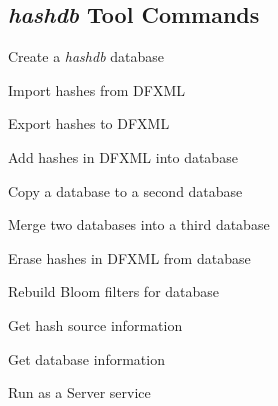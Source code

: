 \documentclass[12pt,twoside]{article}
\newcommand{\hdb}{\emph{hashdb}\xspace}
\begin{document}
\subsection{\hdb Tool Commands}
\begin{compactitem}
\item Create a \hdb database
\item Import hashes from DFXML
\item Export hashes to DFXML
\item Add hashes in DFXML into database
\item Copy a database to a second database
\item Merge two databases into a third database
\item Erase hashes in DFXML from database
\item Rebuild Bloom filters for database
\item Get hash source information
\item Get database information
\item Run as a Server service
\end{compactitem}
\end{document}
